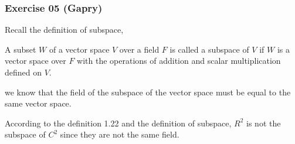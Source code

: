 \subsubsection*{Exercise 05 (Gapry)}

\begin{flushleft}
Recall the definition of subspace, \\
\vspace{10px}

A subset $W$ of a vector space $V$ over a field $F$ is called a subspace of $V$
if $W$ is a vector space over $F$ with the operations of addition and scalar
multiplication defined on $V$.
\vspace{10px}

we know that the field of the subspace of the vector space must be equal to 
the same vector space. 
\vspace{10px}

According to the definition 1.22 and the definition of subspace, 
$R^2$ is not the subspace of $C^2$ since they are not the same field.
\end{flushleft}
